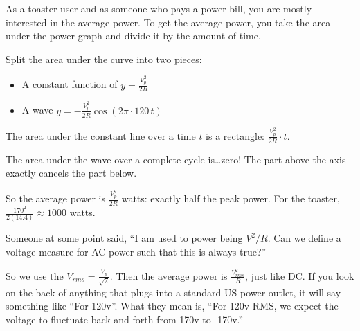 As a toaster user and as someone who pays a power bill, you are mostly
interested in the average power.  To get the average power, you take
the area under the power graph and divide it by the amount of time.

Split the area under the curve into two pieces:
\begin{itemize}
\item A constant function of $y = \frac{V_p^2}{2R}$
\item A wave $y = - \frac{V_p^2}{2R} \cos \left(2\pi \cdot 120\, t \right)$
\end{itemize}

    
The area under the constant line over a time $t$ is a rectangle:
$\frac{V_p^2}{2R} \cdot t$.

The area under the wave over a complete cycle is\ldots zero! The part above
the axis exactly cancels the part below.

So the average power is $\frac{V_p^2}{2R}$ watts: exactly half the peak
power. For the toaster, $\frac{170^2}{2(14.4)} \approx 1000$ watts.

Someone at some point said, ``I am used to power being $V^2/R$. Can
we define a voltage measure for AC power such that this is always true?''

So we use the 
$V_{rms} = \frac{V_p}{\sqrt{2}}$. Then the average power is
$\frac{V_{rms}^2}{R}$, just like DC. If you look on the back of anything that plugs
into a standard US power outlet, it will say something like ``For
120v''.  What they mean is, ``For 120v RMS, we expect the voltage to
fluctuate back and forth from 170v to -170v.''

